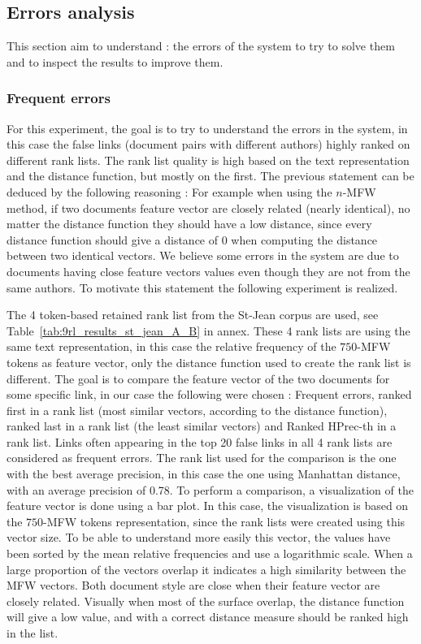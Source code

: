 \subsection{Errors analysis}

This section aim to understand : the errors of the system to try to solve them and to inspect the results to improve them.

\subsubsection{Frequent errors}
\label{sec:frequent_errors}

For this experiment, the goal is to try to understand the errors in the system, in this case the false links (document pairs with different authors) highly ranked on different rank lists.
The rank list quality is high based on the text representation and the distance function, but mostly on the first.
The previous statement can be deduced by the following reasoning : For example when using the $n$-MFW method, if two documents feature vector are closely related (nearly identical), no matter the distance function they should have a low distance, since every distance function should give a distance of 0 when computing the distance between two identical vectors.
We believe some errors in the system are due to documents having close feature vectors values even though they are not from the same authors.
To motivate this statement the following experiment is realized.

The 4 token-based retained rank list from the St-Jean corpus are used, see Table~\ref{tab:9rl_results_st_jean_A_B} in annex.
These 4 rank lists are using the same text representation, in this case the relative frequency of the $750$-MFW tokens as feature vector, only the distance function used to create the rank list is different.
The goal is to compare the feature vector of the two documents for some specific link, in our case the following were chosen : Frequent errors, ranked first in a rank list (most similar vectors, according to the distance function), ranked last in a rank list (the least similar vectors) and Ranked HPrec-th in a rank list.
Links often appearing in the top 20 false links in all 4 rank lists are considered as frequent errors.
The rank list used for the comparison is the one with the best average precision, in this case the one using Manhattan distance, with an average precision of 0.78.
To perform a comparison, a visualization of the feature vector is done using a bar plot.
In this case, the visualization is based on the $750$-MFW tokens representation, since the rank lists were created using this vector size.
To be able to understand more easily this vector, the values have been sorted by the mean relative frequencies and use a logarithmic scale.
When a large proportion of the vectors overlap it indicates a high similarity between the MFW vectors.
Both document style are close when their feature vector are closely related.
Visually when most of the surface overlap, the distance function will give a low value, and with a correct distance measure should be ranked high in the list.

